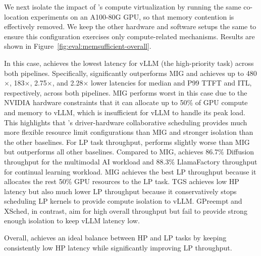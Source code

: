We next isolate the impact of \tool's compute virtualization by running the same co-location experiments on an A100-80G GPU, so that memory contention is effectively removed.
We keep the other hardware and software setups the same to ensure this configuration exercises only compute-related mechanisms.
Results are shown in Figure~\ref{fig:eval:memsufficient-overall}.

In this case, \tool achieves the lowest latency for vLLM (the high-priority task) across both pipelines.
Specifically, \tool significantly outperforms MIG and achieves up to 480$\times$, 183$\times$, 2.75$\times$, and 2.28$\times$ lower latencies for median and P99 TTFT and ITL, respectively, across both pipelines. 
MIG performs worst in this case due to the NVIDIA hardware constraints that it can allocate up to 50\% of GPU compute and memory to vLLM, which is insufficient for vLLM to handle its peak load.
This highlights that \tool's driver-hardware collaborative scheduling provides much more flexible resource limit configurations than MIG and stronger isolation than the other baselines.
For LP task throughput, \tool{} performs slightly worse than MIG but outperforms all other baselines. Compared to MIG, \tool achieves 86.7\% Diffusion throughput for the multimodal AI workload and 88.3\% LlamaFactory throughput for continual learning workload. MIG achieves the best LP throughput because it allocates the rest 50\% GPU resources to the LP task.
TGS achieves low HP latency but also much lower LP throughput because it conservatively stops scheduling LP kernels to provide compute isolation to vLLM. GPreempt and XSched, in contrast, aim for high overall throughput but fail to provide strong enough isolation to keep vLLM latency low.

Overall, \tool{} achieves an ideal balance between HP and LP tasks by keeping consistently low HP latency while significantly improving LP throughput.

